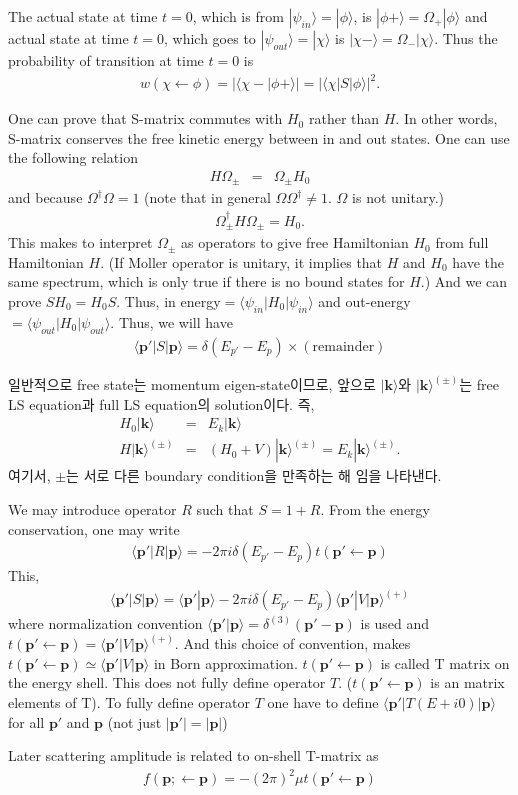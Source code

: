 \documentclass[10pt]{book}
\def\bm{\boldsymbol}
\newcommand{\bea}{\begin{eqnarray}}
\newcommand{\eea}{\end{eqnarray}}
\newcommand{\no}{\nonumber \\}
\def\vp{{\bm p}}
\def\vk{{\bm k}}
\def\la{\langle}
\def\ra{\rangle}
\begin{document}
The actual state at time $t=0$, which is from $|\psi_{in}\ra=|\phi\ra$, is  $|\phi+\ra=\Omega_{+}|\phi\ra$
and actual state at time $t=0$, which goes to $|\psi_{out}\ra=|\chi\ra$ is 
$|\chi-\ra=\Omega_{-}|\chi\ra $. 
Thus the probability of transition at time $t=0$ is 
\bea
w(\chi\leftarrow \phi)=|\la \chi-|\phi+\ra|=|\la\chi|S|\phi\ra|^2.
\eea

One can prove that S-matrix commutes with $H_0$ rather than $H$.
In other words, S-matrix conserves the free kinetic energy between in and out states. 
One can use the following relation
\bea 
H\Omega_{\pm}&=& \Omega_{\pm} H_0 
\eea 
and because $\Omega^\dagger \Omega=1$ (note that in general $\Omega\Omega^\dagger\neq 1$. $\Omega$ is not unitary.)
\bea 
\Omega^\dagger_{\pm} H \Omega_{\pm}=H_0.
\eea 
This makes to interpret $\Omega_{\pm}$ as operators to give free Hamiltonian $H_0$
from full Hamiltonian $H$. (If Moller operator is unitary, it implies that $H$ and $H_0$ have the same spectrum,
which is only true if there is no bound states for $H$.)
And we can prove $SH_0= H_0 S$. Thus,
in energy$= \la \psi_{in}|H_0|\psi_{in}\ra$ and out-energy$=\la \psi_{out}|H_0|\psi_{out}\ra$. 
Thus, we will have 
\bea 
\la \vp'|S|\vp\ra =\delta(E_{p'}-E_{p})\times(\mbox{remainder})
\eea   


일반적으로 free state는 momentum eigen-state이므로, 앞으로 
$|\vk\ra$와 $|\vk\ra^{(\pm)}$는 free LS equation과 
full LS equation의 solution이다. 즉,
\bea
H_0|\vk\ra&=&E_k|\vk\ra\no
H|\vk\ra^{(\pm)}&=&(H_0+V)|\vk\ra^{(\pm)}=E_k|\vk\ra^{(\pm)}.
\eea
여기서, $\pm$는 서로 다른 boundary condition을 만족하는 해 임을 
나타낸다.


We may introduce operator $R$ such that $S=1+R$. From the energy conservation, one may write
\bea 
\la \vp'|R|\vp\ra = -2\pi i \delta(E_{p'}-E_p) t(\vp'\leftarrow \vp)
\eea 
This,
\bea
\boxed{ \la \vp'|S|\vp\ra =\la \vp'|\vp\ra -2\pi i \delta(E_{p'}-E_p) \la \vp'|V|\vp\ra^{(+)} }
\eea 
where normalization convention $\la \vp'|\vp\ra=\delta^{(3)}(\vp'-\vp)$ is used
and $t(\vp'\leftarrow \vp)=\la \vp'|V|\vp\ra^{(+)} $. 
And this choice of convention, makes $t(\vp'\leftarrow \vp)\simeq \la \vp'|V|\vp\ra$ in Born approximation. 
$t(\vp'\leftarrow \vp)$ is called T matrix {\color{red} on the energy shell}. 
This does not fully define operator $T$. ($t(\vp'\leftarrow \vp)$ is an matrix elements of T).
To fully define operator $T$ one have to define $\la \vp'|T(E+i 0)|\vp\ra$ for all $\vp'$ and $\vp$
(not just $|\vp'|=|\vp|$)

Later scattering amplitude is related to on-shell T-matrix as
\bea 
\boxed{f(\vp;\leftarrow \vp)=-(2\pi)^2\mu t(\vp'\leftarrow \vp)}
\eea 
\end{document}
